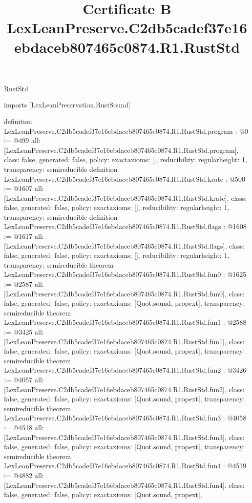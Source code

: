 \begin{lexlean}{RustStd}
\title{Certificate B LexLeanPreserve.C2db5cadef37e16ebdaceb807465c0874.R1.RustStd}
\begin{coremodule}
imports [LexLeanPreservation.RustSound]

definition LexLeanPreserve.C2db5cadef37e16ebdaceb807465c0874.R1.RustStd.program : @0 := @499 {
  all: [LexLeanPreserve.C2db5cadef37e16ebdaceb807465c0874.R1.RustStd.program],
  class: false,
  generated: false,
  policy: exact{axioms: []},
  reducibility: regular{height: 1},
  transparency: semireducible
}
definition LexLeanPreserve.C2db5cadef37e16ebdaceb807465c0874.R1.RustStd.krate : @500 := @1607 {
  all: [LexLeanPreserve.C2db5cadef37e16ebdaceb807465c0874.R1.RustStd.krate],
  class: false,
  generated: false,
  policy: exact{axioms: []},
  reducibility: regular{height: 1},
  transparency: semireducible
}
definition LexLeanPreserve.C2db5cadef37e16ebdaceb807465c0874.R1.RustStd.flags : @1608 := @1617 {
  all: [LexLeanPreserve.C2db5cadef37e16ebdaceb807465c0874.R1.RustStd.flags],
  class: false,
  generated: false,
  policy: exact{axioms: []},
  reducibility: regular{height: 1},
  transparency: semireducible
}
theorem LexLeanPreserve.C2db5cadef37e16ebdaceb807465c0874.R1.RustStd.fun0 : @1625 := @2587 {
  all: [LexLeanPreserve.C2db5cadef37e16ebdaceb807465c0874.R1.RustStd.fun0],
  class: false,
  generated: false,
  policy: exact{axioms: [Quot.sound, propext]},
  transparency: semireducible
}
theorem LexLeanPreserve.C2db5cadef37e16ebdaceb807465c0874.R1.RustStd.fun1 : @2588 := @3425 {
  all: [LexLeanPreserve.C2db5cadef37e16ebdaceb807465c0874.R1.RustStd.fun1],
  class: false,
  generated: false,
  policy: exact{axioms: [Quot.sound, propext]},
  transparency: semireducible
}
theorem LexLeanPreserve.C2db5cadef37e16ebdaceb807465c0874.R1.RustStd.fun2 : @3426 := @4057 {
  all: [LexLeanPreserve.C2db5cadef37e16ebdaceb807465c0874.R1.RustStd.fun2],
  class: false,
  generated: false,
  policy: exact{axioms: [Quot.sound, propext]},
  transparency: semireducible
}
theorem LexLeanPreserve.C2db5cadef37e16ebdaceb807465c0874.R1.RustStd.fun3 : @4058 := @4518 {
  all: [LexLeanPreserve.C2db5cadef37e16ebdaceb807465c0874.R1.RustStd.fun3],
  class: false,
  generated: false,
  policy: exact{axioms: [Quot.sound, propext]},
  transparency: semireducible
}
theorem LexLeanPreserve.C2db5cadef37e16ebdaceb807465c0874.R1.RustStd.fun4 : @4519 := @4882 {
  all: [LexLeanPreserve.C2db5cadef37e16ebdaceb807465c0874.R1.RustStd.fun4],
  class: false,
  generated: false,
  policy: exact{axioms: [Quot.sound, propext]},
}
\end{coremodule}
\end{lexlean}
